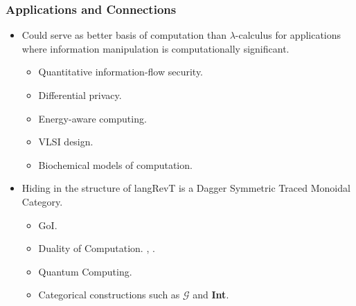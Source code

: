\documentclass[svgnames,11pt]{beamer}
\newcommand{\lcal}{\ensuremath{\lambda}-calculus\xspace}
\begin{document}
\begin{frame}
\frametitle{Applications and Connections}

\begin{itemize}

\vfill
\item Could serve as better basis of computation than \lcal for
  applications where information manipulation is computationally
  significant.

  \begin{itemize}
  \item Quantitative information-flow security.~\cite{myerssab}
  \item Differential privacy.~\cite{dwork:differential}
  \item Energy-aware computing.~\cite{1324180,605411}
  \item VLSI design.~\cite{Macii:1996:ECE:874066.875828}
  \item Biochemical models of computation.~\cite{bio}

  \end{itemize}

\vfill

\item Hiding in the structure of {{langRevT}} is a Dagger Symmetric
  Traced Monoidal Category.

  \begin{itemize}
  \item GoI. \cite{girard1989geometry}

  \item Duality of Computation. \cite{Filinski:1989:DCI:648332.755574}, \cite{curien00duality}.

  \item Quantum Computing. 

  \item Categorical constructions such as \ensuremath{\mathcal{G}} and \textbf{Int}. 

  \end{itemize}

\end{itemize}

\vfill

\end{frame}


\begin{frame}

\vfill
  \begin{center}
  \end{center}
\vfill

\end{frame}
\end{document}
